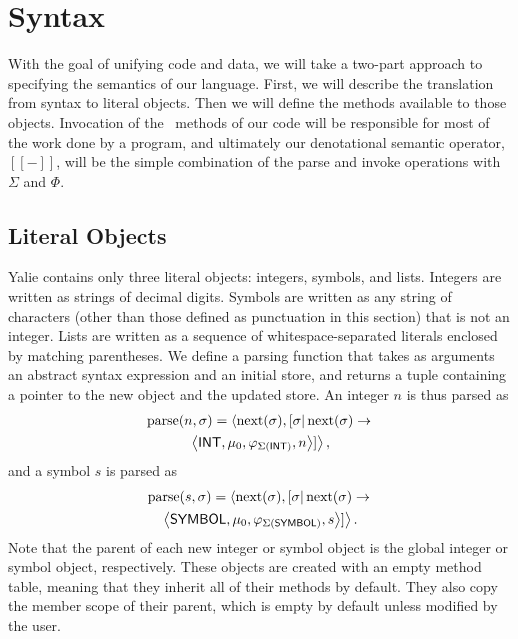 \documentclass[twocolumn]{article}
\begin{document}
\section*{Syntax}

With the goal of unifying code and data, we will take a two-part
approach to specifying the semantics of our language. First, we will
describe the translation from syntax to literal objects. Then we will
define the methods available to those objects. Invocation of the
\eval\ methods of our code will be responsible for most of the work
done by a program, and ultimately our denotational semantic operator,
$[\![-]\!]$, will be the simple combination of the parse and invoke
operations with $\Sigma$ and $\Phi$.

\subsection*{Literal Objects}
Yalie contains only three literal objects: integers, symbols, and
lists. Integers are written as strings of decimal digits. Symbols are
written as any string of characters (other than those defined as
punctuation in this section) that is not an integer. Lists are written
as a sequence of whitespace-separated literals enclosed by matching
parentheses. We define a parsing function that takes as arguments an
abstract syntax expression and an initial store, and returns a tuple
containing a pointer to the new object and the updated store.
An integer $n$ is thus parsed as
\begin{multline*}
\operatorname{parse}(n,\sigma) =
\left<\operatorname{next}(\sigma),[\sigma|\operatorname{next}(\sigma) \rightarrow\right. \\
\left.\left<\mathsf{INT}, \mu_0, \varphi_{\Sigma(\mathsf{INT})}, n\right>]\right>,
\end{multline*}
and a symbol $s$ is parsed as
\begin{multline*}
  \operatorname{parse}(s,\sigma) =
  \left<\operatorname{next}(\sigma),[\sigma|\operatorname{next}(\sigma) \rightarrow\right. \\
\left.\left<\mathsf{SYMBOL}, \mu_0, \varphi_{\Sigma(\mathsf{SYMBOL})},
  s\right>]\right>.
\end{multline*}
Note that the parent of each new integer or symbol object is the
global integer or symbol object, respectively. These objects are
created with an empty method table, meaning that they inherit all of
their methods by default. They also copy the member scope of their
parent, which is empty by default unless modified by the user.
\end{document}
